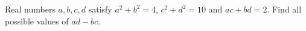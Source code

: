 Real numbers $a,b,c,d$ satisfy $a^2+b^2=4$, $c^2+d^2=10$ and $ac+bd=2$. Find all possible values of $ad-bc$.
